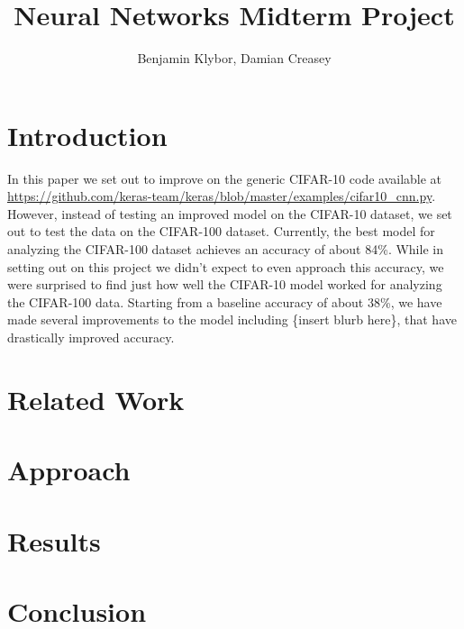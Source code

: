 \documentclass{article}
\title{Neural Networks Midterm Project}
\author{Benjamin Klybor, Damian Creasey}
\begin{document}
\maketitle

\section{Introduction}
In this paper we set out to improve on the generic CIFAR-10 code available at \url{https://github.com/keras-team/keras/blob/master/examples/cifar10_cnn.py}. However, instead of testing an improved model on the CIFAR-10 dataset, we set out to test the data on the CIFAR-100 dataset. Currently, the best model for analyzing the CIFAR-100 dataset achieves an accuracy of about 84\%. While in setting out on this project we didn't expect to even approach this accuracy, we were surprised to find just how well the CIFAR-10 model worked for analyzing the CIFAR-100 data. Starting from a baseline accuracy of about 38\%, we have made several improvements to the model including \{insert blurb here\}, that have drastically improved accuracy.

\section{Related Work}

\section{Approach}

\section{Results}

\section{Conclusion}
\end{document}
